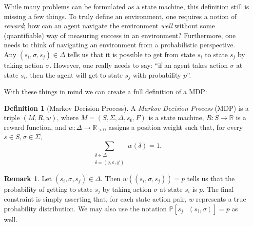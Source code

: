 \documentclass[12pt,oneside,oldfontcommands]{memoir}
\newcommand{\R}{\mathbb{R}}
\theoremstyle{definition}
\newtheorem{defn}{Definition}
\newtheorem{remark}{Remark}
\renewcommand{\d}{\delta}
\newcommand{\s}{\sigma}
\begin{document}
\begin{Subsection}
While many problems can be formulated as a state machine, this definition still is missing a few things. To truly define an environment, one requires a notion of \textit{reward}; how can an agent navigate the environment \textit{well} without some (quantifiable) way of measuring success in an environment? Furthermore, one needs to think of navigating an environment from a probabilistic perspective. Any $(s_i, \s, s_j) \in \Delta$ tells us that it is possible to get from state $s_i$ to state $s_j$ by taking action $\s$. However, one really needs to say: ``if an agent takes action $\s$ at state $s_i$, then the agent will get to state $s_j$ with probability $p$''. 

With these things in mind we can create a full definition of a MDP:
\begin{defn}[Markov Decision Process]
A \textit{Markov Decision Process} (MDP) is a triple $(M, R, w)$, where $M = (S, \Sigma, \Delta, s_0, F)$ is a state machine, $R: S \to \R$ is a reward function, and $w: \Delta \to \R_{>0}$ assigns a position weight such that, for every $s \in S, \s \in \Sigma$,
$$
\sum_{\substack{\d \in \Delta \\ \d = (q,\s,q')}} w(\d) = 1.
$$
\end{defn}

\begin{remark}
Let $(s_i, \s, s_j) \in \Delta$. Then $w((s_i,\s,s_j)) = p$ tells us that the probability of getting to state $s_j$ by taking action $\s$ at state $s_i$ is $p$. The final constraint is simply asserting that, for each state action pair, $w$ represents a true probability distribution. We may also use the notation $\mathbb{P}[s_j \ |\ (s_i, \s)] = p$ as well. 
\end{remark}
\end{Subsection}
\end{document}
